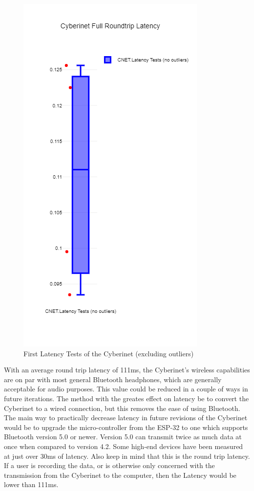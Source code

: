 \begin{figure}
    \centering
    \includegraphics[scale=0.5]{newplot (1).png}
    \caption{First Latency Tests of the Cyberinet (excluding outliers)}
    \label{fig:latencyTest1}
\end{figure}

With an average round trip latency of 111ms, the Cyberinet's wireless capabilities are on par with most general Bluetooth headphones, which are generally acceptable for audio purposes. This value could be reduced in a couple of ways in future iterations. The method with the greates effect on latency be to convert the Cyberinet to a wired connection\cite{bluetoothLatency}, but this removes the ease of using Bluetooth. The main way to practically decrease latency in future revisions of the Cyberinet would be to upgrade the micro-controller from the ESP-32 to one which supports Bluetooth version 5.0 or newer. Version 5.0 can transmit twice as much data at once when compared to version 4.2\cite{btSpecs}. Some high-end devices have been measured at just over 30ms of latency\cite{bluetoothLatency}. Also keep in mind that this is the round trip latency. If a user is recording the data, or is otherwise only concerned with the transmission from the Cyberinet to the computer, then the Latency would be lower than 111ms.

